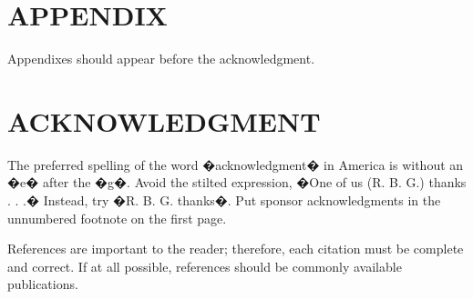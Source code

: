 \documentclass[letterpaper, 10 pt, conference]{ieeeconf}  %
\begin{document}
\section*{APPENDIX}

Appendixes should appear before the acknowledgment.

\section*{ACKNOWLEDGMENT}

The preferred spelling of the word �acknowledgment� in America is without an �e� after the �g�. Avoid the stilted expression, �One of us (R. B. G.) thanks . . .�  Instead, try �R. B. G. thanks�. Put sponsor acknowledgments in the unnumbered footnote on the first page.




References are important to the reader; therefore, each citation must be complete and correct. If at all possible, references should be commonly available publications.



\end{document}
